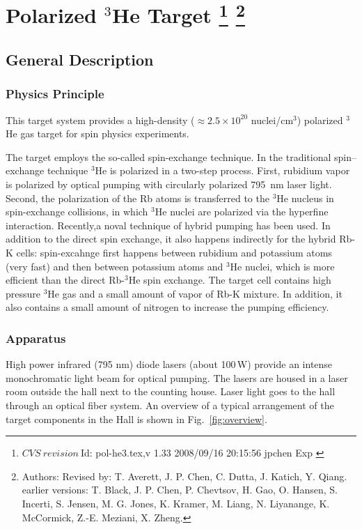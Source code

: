 \chapter[Polarized $^3$He Target]{Polarized $^3$He Target
\footnote{
  $CVS~revision~ $Id: pol-he3.tex,v 1.33 2008/09/16 20:15:56 jpchen Exp $ $
}
\footnote{Authors: Revised by: T. Averett, J. P. Chen, C. Dutta, J. Katich,
Y. Qiang. earlier versions: 
T. Black, J. P. Chen, P. Chevtsov, H. Gao, 
O. Hansen, S. Incerti, S. Jensen, M. G. Jones, K. Kramer, M. Liang, 
N. Liyanange, K. McCormick, Z.-E. Meziani, X. Zheng.
}
}

\section{General Description}
\label{sec:target-he3-general}
\subsection{Physics Principle}

This target system provides a high-density 
($\approx 2.5\times 10^{20}$ nuclei/cm$^3$)
polarized $^3$He gas target for spin physics experiments. 

The target employs the so-called spin-exchange technique.
In the traditional spin--exchange technique $^3$He is polarized in 
a two-step process.
First, rubidium vapor is polarized by optical pumping with
circularly polarized 795~nm laser light. Second, the polarization
of the Rb atoms is transferred to the $^3$He nucleus in spin-exchange
collisions, in which $^3$He nuclei are polarized via the hyperfine interaction.
Recently,a noval technique of hybrid pumping has been used.  
In addition to the direct spin exchange, it also happens indirectly for the 
hybrid Rb-K cells: spin-excahnge first happens between rubidium and potassium atoms 
(very fast) and 
then between potassium atoms and $^3$He nuclei, which is more efficient 
than the direct Rb-$^3$He spin exchange.
The target cell contains high pressure $^3$He gas and a small amount of
vapor of Rb-K mixture. 
In addition, it
also contains a small amount of nitrogen to increase the
pumping efficiency.

\subsection{Apparatus}

High power infrared (795 nm) diode lasers (about 100\,W) provide an intense 
monochromatic
light beam for optical pumping. 
The lasers are housed in a laser room
outside the hall next to the counting house. Laser light goes to the hall 
through an optical fiber system.  An overview of a
typical arrangement of the target components in the Hall is shown in
Fig.~\ref{fig:overview}.

